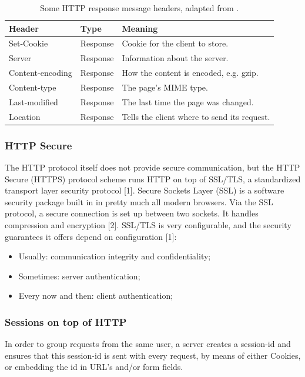 \begin{table}[H]
	\caption{Some HTTP response message headers, adapted from \cite{Tanenbaum:2002:CN:572404}.}
	\label{tab:}
	\begin{tabular}{p{75px} | p{75px} | p{200px} }
		\textbf{Header} & \textbf{Type} & \textbf{Meaning} \\
		\hline
		Set-Cookie				& Response & Cookie for the client to store. 							\\
		Server						& Response & Information about the server. 								\\
		Content-encoding	& Response & How the content is encoded, e.g. gzip. 			\\
		Content-type			& Response & The page's MIME type. 												\\
		Last-modified			& Response & The last time the page was changed. 					\\
		Location					& Response & Tells the client where to send its request. 	\\
		\hline
	\end{tabular}
\end{table}


\subsubsection{HTTP Secure}

The HTTP protocol itself does not provide secure communication, but the HTTP Secure (HTTPS) protocol scheme runs HTTP on top of SSL/TLS, a standardized transport layer security protocol [1]. Secure Sockets Layer (SSL) is a software security package built in in pretty much all modern browsers. Via the SSL protocol, a secure connection is set up between two sockets. It handles compression and encryption [2]. SSL/TLS is very configurable, and the security guarantees it offers depend on configuration [1]:
\begin{itemize}
	\item Usually: communication integrity and confidentiality;
	\item Sometimes: server authentication;
	\item Every now and then: client authentication;
\end{itemize}


\subsubsection{Sessions on top of HTTP}

In order to group requests from the same user, a server creates a session-id and ensures that this session-id is sent with every request, by means of either Cookies, or embedding the id in URL's and/or form fields.

